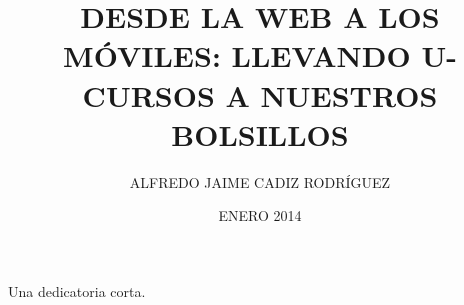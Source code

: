 \documentclass[upright, contnum]{umemoria}
\author{ALFREDO JAIME CADIZ RODRÍGUEZ}
\title{DESDE LA WEB A LOS MÓVILES: LLEVANDO U-CURSOS A NUESTROS BOLSILLOS}
\date{ENERO 2014}
\begin{document}
\frontmatter
\maketitle

\begin{abstract}
\lipsum[1-4]
\end{abstract}

\begin{dedicatoria}
Una dedicatoria corta.
\end{dedicatoria}

\begin{thanks}
\lipsum[1-2]
\end{thanks}

\cleardoublepage
\tableofcontents
\cleardoublepage
\listoftables
\cleardoublepage
\listoffigures

\mainmatter






\nocite{*}

{}

\end{document}
